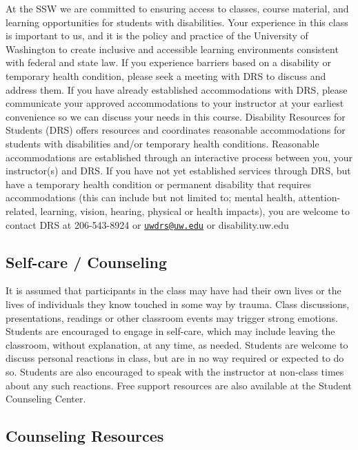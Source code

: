 \documentclass[11pt,]{article}
\begin{document}
At the SSW we are committed to ensuring access to classes, course
material, and learning opportunities for students with disabilities.
Your experience in this class is important to us, and it is the policy
and practice of the University of Washington to create inclusive and
accessible learning environments consistent with federal and state law.
If you experience barriers based on a disability or temporary health
condition, please seek a meeting with DRS to discuss and address them.
If you have already established accommodations with DRS, please
communicate your approved accommodations to your instructor at your
earliest convenience so we can discuss your needs in this course.
Disability Resources for Students (DRS) offers resources and coordinates
reasonable accommodations for students with disabilities and/or
temporary health conditions. Reasonable accommodations are established
through an interactive process between you, your instructor(s) and DRS.
If you have not yet established services through DRS, but have a
temporary health condition or permanent disability that requires
accommodations (this can include but not limited to; mental health,
attention-related, learning, vision, hearing, physical or health
impacts), you are welcome to contact DRS at 206-543-8924 or
\href{mailto:uwdrs@uw.edu}{\nolinkurl{uwdrs@uw.edu}} or
disability.uw.edu

\subsection{Self-care / Counseling}\label{self-care-counseling}

It is assumed that participants in the class may have had their own
lives or the lives of individuals they know touched in some way by
trauma. Class discussions, presentations, readings or other classroom
events may trigger strong emotions. Students are encouraged to engage in
self-care, which may include leaving the classroom, without explanation,
at any time, as needed. Students are welcome to discuss personal
reactions in class, but are in no way required or expected to do so.
Students are also encouraged to speak with the instructor at non-class
times about any such reactions. Free support resources are also
available at the Student Counseling Center.

\subsection{Counseling Resources}\label{counseling-resources}
\end{document}
